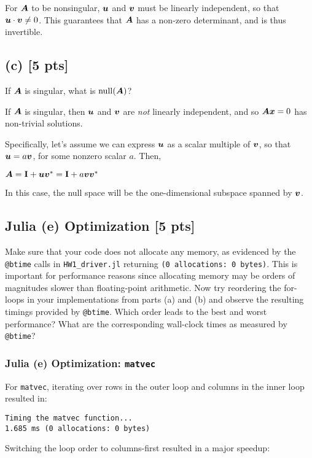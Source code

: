 \documentclass[twoside,10pt]{article}
\begin{document}
For $\bm{A}$ to be nonsingular, $\bm{u}$ and $\bm{v}$ must be linearly independent, so that $\bm{u} \cdot \bm{v} \neq 0$. 
This guarantees that $\bm{A}$ has a non-zero determinant, and is thus invertible.

\subsection*{(c) [5 pts]} 
If $\bm{A}$ is singular, what is $\operatorname{null}(\bm{A})$?

If $\bm{A}$ is singular, then $\bm{u}$ and $\bm{v}$ are \textit{not} linearly independent, and so $\bm{A}\bm{x} = 0$ has non-trivial solutions.

Specifically, let's assume we can express $\bm{u}$ as a scalar multiple of $\bm{v}$, so that $\bm{u} = a\bm{v}$, for some nonzero scalar $a$.
Then,

$\bm{A} = \mathbf{I} + \bm{u}\bm{v}^{*} = \mathbf{I} + a\bm{v}\bm{v}^{*}$

In this case, the null space will be the one-dimensional subspace spanned by $\bm{v}$.

\subsection*{Julia (e) Optimization [5 pts]} 
Make sure that your code does not allocate any memory, as evidenced by the \texttt{@btime} calls in \texttt{HW1\_driver.jl} returning \texttt{(0\,allocations:\,0\,bytes)}.
This is important for performance reasons since allocating memory may be orders of magnitudes slower than floating-point arithmetic. 
Now try reordering the for-loops in your implementations from parts (a) and (b) and observe the resulting timings provided by \texttt{@btime}. 
Which order leads to the best and worst performance? 
What are the corresponding wall-clock times as measured by \texttt{@btime}? 

\subsubsection*{Julia (e) Optimization: \texttt{matvec}}

For \texttt{matvec}, iterating over rows in the outer loop and columns in the inner loop resulted in:

\begin{verbatim}
Timing the matvec function...
1.685 ms (0 allocations: 0 bytes)
\end{verbatim}

Switching the loop order to columns-first resulted in a major speedup:
\end{document}
